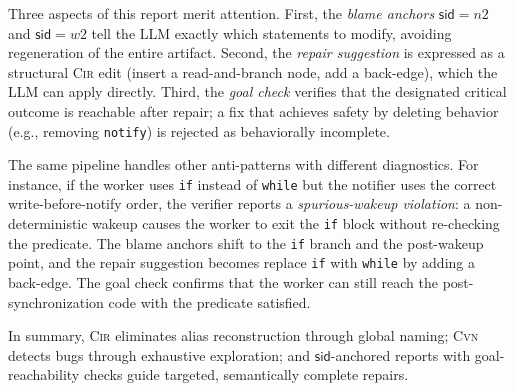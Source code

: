 Three aspects of this report merit attention. First, the \emph{blame anchors} $\mathsf{sid}{=}n2$ and $\mathsf{sid}{=}w2$ tell the LLM exactly which statements to modify, avoiding regeneration of the entire artifact. Second, the \emph{repair suggestion} is expressed as a structural \textsc{Cir} edit (insert a read-and-branch node, add a back-edge), which the LLM can apply directly. Third, the \emph{goal check} verifies that the designated critical outcome is reachable after repair; a fix that achieves safety by deleting behavior (e.g., removing \texttt{notify}) is rejected as behaviorally incomplete.

The same pipeline handles other anti-patterns with different diagnostics. For instance, if the worker uses \texttt{if} instead of \texttt{while} but the notifier uses the correct write-before-notify order, the verifier reports a \emph{spurious-wakeup violation}: a
non-deterministic wakeup causes the worker to exit the \texttt{if} block without re-checking the predicate. The blame anchors shift to the \texttt{if} branch and the post-wakeup point, and the repair suggestion becomes replace \texttt{if} with \texttt{while} by adding a back-edge. The goal check confirms that the worker can still reach the post-synchronization code with the predicate satisfied.

\medskip
\noindent
In summary, \textsc{Cir} eliminates alias reconstruction through global naming; \textsc{Cvn} detects bugs through exhaustive exploration; and $\mathsf{sid}$-anchored reports with goal-reachability checks guide targeted, semantically complete repairs.
